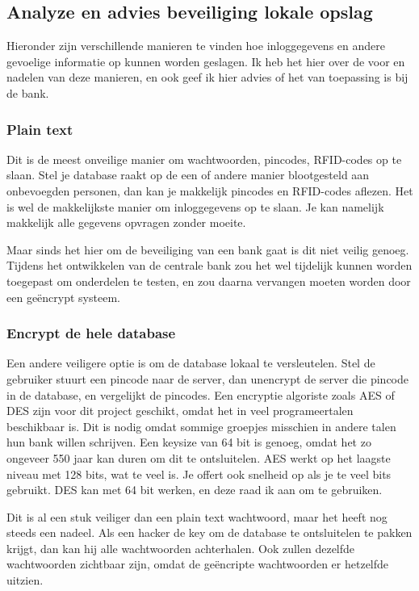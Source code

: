 \documentclass{article}
\begin{document}
\newpage

\subsection{Analyze en advies beveiliging lokale opslag} 

Hieronder zijn verschillende manieren te vinden hoe inloggegevens en andere gevoelige informatie op kunnen worden geslagen.
Ik heb het hier over de voor en nadelen van deze manieren, en ook geef ik hier advies of het van toepassing is bij de bank.

\subsubsection{Plain text}

Dit is de meest onveilige manier om wachtwoorden, pincodes, RFID-codes op te slaan.
Stel je database raakt op de een of andere manier blootgesteld aan onbevoegden personen, dan kan je makkelijk pincodes en RFID-codes aflezen. 
Het is wel de makkelijkste manier om inloggegevens op te slaan.
Je kan namelijk makkelijk alle gegevens opvragen zonder moeite.

Maar sinds het hier om de beveiliging van een bank gaat is dit niet veilig genoeg.
Tijdens het ontwikkelen van de centrale bank zou het wel tijdelijk kunnen worden toegepast om onderdelen te testen, en zou daarna vervangen moeten worden door een ge\"encrypt systeem.

\subsubsection{Encrypt de hele database}

Een andere veiligere optie is om de database lokaal te versleutelen.
Stel de gebruiker stuurt een pincode naar de server, dan unencrypt de server die pincode in de database, en vergelijkt de pincodes.
Een encryptie algoriste zoals AES of DES zijn voor dit project geschikt, omdat het in veel programeertalen beschikbaar is.
Dit is nodig omdat sommige groepjes misschien in andere talen hun bank willen schrijven.
Een keysize van 64 bit is genoeg, omdat het zo ongeveer 550 jaar kan duren om dit te ontsluitelen.
AES werkt op het laagste niveau met 128 bits, wat te veel is.
Je offert ook snelheid op als je te veel bits gebruikt.
DES kan met 64 bit werken, en deze raad ik aan om te gebruiken.

Dit is al een stuk veiliger dan een plain text wachtwoord, maar het heeft nog steeds een nadeel.
Als een hacker de key om de database te ontsluitelen te pakken krijgt, dan kan hij alle wachtwoorden achterhalen.
Ook zullen dezelfde wachtwoorden zichtbaar zijn, omdat de ge\"encripte wachtwoorden er hetzelfde uitzien.
\end{document}
